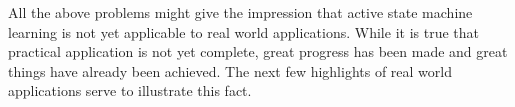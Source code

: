 \documentclass[multi,crop=false,class=article]{standalone}
\begin{document}

All the above problems might give the impression that active state machine
learning is not yet applicable to real world applications. While it is true that
practical application is not yet complete, great progress has been made and
great things have already been achieved. The next few highlights of real world
applications serve to illustrate this fact.

\end{document}
